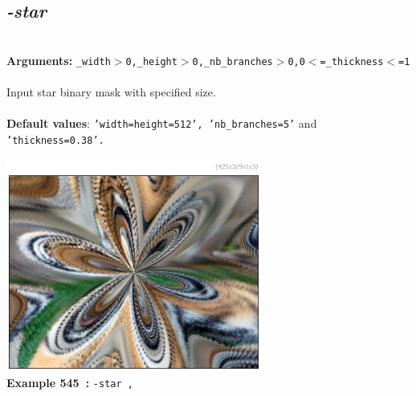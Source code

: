 \documentclass[a4paper,11pt,twoside]{book}
\begin{document}
\subsection{\emph{-star} }\vspace*{-0.5em}
~\\\textbf{Arguments: } 
{\small \texttt{\_width$>$0,\_height$>$0,\_nb\_branches$>$0,0$<$=\_thickness$<$=1}}\\~\\
Input star binary mask with specified size.
~\\~\\\textbf{Default values}: {\small \texttt{'width=height=512', 'nb\_branches=5'} and \texttt{'thickness=0.38'.}}
\begin{center}\includegraphics[keepaspectratio=true,height=7cm,width=\textwidth]{img/gmic_def545.jpg}\\
{\footnotesize \textbf{Example 545~:} \texttt{-star ,}}
\end{center}
\end{document}
